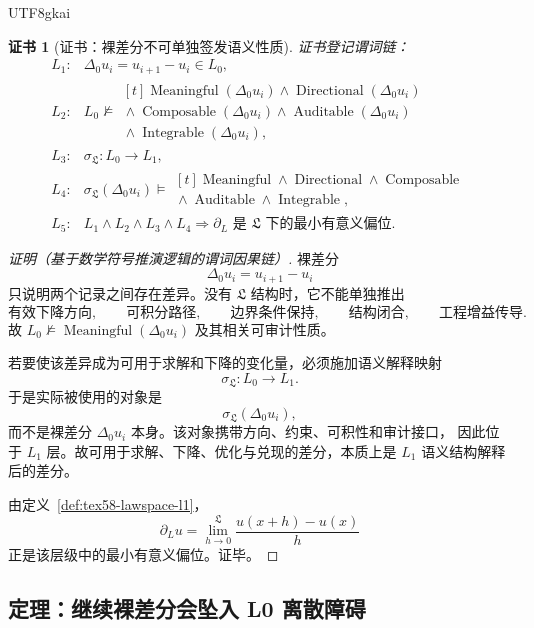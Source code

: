 \documentclass[12pt]{article}
\newtheorem{Certificate}{证书}[section]
\DeclareMathOperator{\Meaningful}{Meaningful}
\DeclareMathOperator{\Directional}{Directional}
\DeclareMathOperator{\Composable}{Composable}
\DeclareMathOperator{\Auditable}{Auditable}
\DeclareMathOperator{\Integrable}{Integrable}
\begin{document}
\begin{CJK*}{UTF8}{gkai}
\begin{Certificate}[证书：裸差分不可单独签发语义性质]
\label{cert:tex58-l1-minimal-meaningful}
证书登记谓词链：
\[
\begin{array}{rl}
  L_1: & \Delta_0u_i=u_{i+1}-u_i\in L_0,\\[2pt]
  L_2: & L_0\not\models
  \begin{gathered}[t]
    \Meaningful(\Delta_0u_i)\wedge\Directional(\Delta_0u_i)\\
    {}\wedge\Composable(\Delta_0u_i)\wedge\Auditable(\Delta_0u_i)\\
    {}\wedge\Integrable(\Delta_0u_i),
  \end{gathered}\\[8pt]
  L_3: & \sigma_{\mathfrak L}:L_0\to L_1,\\[2pt]
  L_4: & \sigma_{\mathfrak L}(\Delta_0u_i)
  \models
  \begin{gathered}[t]
    \Meaningful\wedge\Directional\wedge\Composable\\
    {}\wedge\Auditable\wedge\Integrable,
  \end{gathered}\\[8pt]
  L_5: & L_1\wedge L_2\wedge L_3\wedge L_4
  \Rightarrow
  \partial_L\text{ 是 }\mathfrak L\text{ 下的最小有意义偏位}.
\end{array}
\]
\end{Certificate}

\begin{proof}[证明（基于数学符号推演逻辑的谓词因果链）]
裸差分
\[
  \Delta_0u_i=u_{i+1}-u_i
\]
只说明两个记录之间存在差异。没有 \(\mathfrak L\) 结构时，它不能单独推出
\[
  \text{有效下降方向},
  \qquad
  \text{可积分路径},
  \qquad
  \text{边界条件保持},
  \qquad
  \text{结构闭合},
  \qquad
  \text{工程增益传导}.
\]
故 \(L_0\not\models\Meaningful(\Delta_0u_i)\) 及其相关可审计性质。

若要使该差异成为可用于求解和下降的变化量，必须施加语义解释映射
\[
  \sigma_{\mathfrak L}:L_0\to L_1.
\]
于是实际被使用的对象是
\[
  \sigma_{\mathfrak L}(\Delta_0u_i),
\]
而不是裸差分 \(\Delta_0u_i\) 本身。该对象携带方向、约束、可积性和审计接口，
因此位于 \(L_1\) 层。故可用于求解、下降、优化与兑现的差分，本质上是 \(L_1\)
语义结构解释后的差分。

由定义~\ref{def:tex58-lawspace-l1}，
\[
  \partial_Lu
  =
  \lim_{h\to0}^{\mathfrak L}
  \frac{u(x+h)-u(x)}{h}
\]
正是该层级中的最小有意义偏位。证毕。
\end{proof}

\subsection{定理：继续裸差分会坠入 L0 离散障碍}
\label{subsec:tex58-l0-obstruction}


\end{CJK*}
\end{document}
